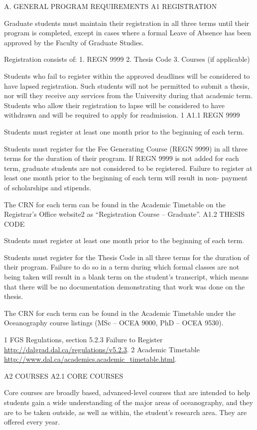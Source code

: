 \documentclass{article}
\newcommand\elink[1]{\url{#1}}
\begin{document}
A.	GENERAL  PROGRAM REQUIREMENTS
A1	REGISTRATION

Graduate students must maintain their registration in all three terms until their program is completed, except in cases where a formal Leave of Absence has been approved by the Faculty of Graduate Studies.

Registration consists of:
1.	REGN 9999
2.	Thesis Code
3.	Courses (if applicable)

Students who fail to register within the approved deadlines will be considered to have lapsed registration. Such students will not be permitted to submit a thesis, nor will they receive any services from the University during that academic term. Students who allow their registration to lapse will be considered to have withdrawn and will be required to apply for readmission. 1
A1.1	REGN 9999

Students must register at least one month prior to the beginning of each term.

Students must register for the Fee Generating Course (REGN 9999) in all three terms for the duration of their program. If REGN 9999 is not added for each term, graduate students are not considered to be registered. Failure to register at least one month prior to the beginning of each term will result in non- payment of scholarships and stipends.

The CRN for each term can be found in the Academic Timetable on the Registrar’s Office website2 as “Registration Course – Graduate”.
A1.2	THESIS CODE

Students must register at least one month prior to the beginning of each term.

Students must register for the Thesis Code in all three terms for the duration of their program. Failure to do so in a term during which formal classes are not being taken will result in a blank term on the student’s transcript, which means that there will be no documentation demonstrating that work was done on the thesis.

The CRN for each term can be found in the Academic Timetable under the Oceanography course listings (MSc – OCEA 9000, PhD – OCEA 9530).




1 FGS Regulations, section 5.2.3 Failure to Register \elink{http://dalgrad.dal.ca/regulations/v5.2.3}.
2 Academic Timetable \elink{http://www.dal.ca/academics.academic_timetable.html}.
 

A2	COURSES
A2.1	CORE COURSES

Core courses are broadly based, advanced-level courses that are intended to help students gain a wide understanding of the major areas of oceanography, and they are to be taken outside, as well as within, the student’s research area. They are offered every year.
\end{document}
